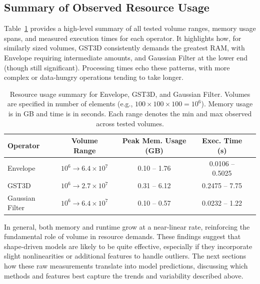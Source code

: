 \subsection{Summary of Observed Resource Usage}
\label{subsec:resource-usage-summary}

Table~\ref{tab:operator_summary_aggregates} provides a high-level summary of all tested volume ranges, memory usage spans, and measured execution times for each operator.
It highlights how, for similarly sized volumes, \ac{GST3D} consistently demands the greatest  \ac{RAM}, with Envelope requiring intermediate amounts, and Gaussian Filter at the lower end (though still significant).
Processing times echo these patterns, with more complex or data-hungry operations tending to take longer.

\begin{table}[htbp]
    \centering
    \begin{tabular}{lcccc}
        \hline
        \textbf{Operator} & \textbf{Volume Range} & \textbf{Peak Mem. Usage (GB)} & \textbf{Exec. Time (s)} \\ \hline
        Envelope &
        $10^6 \!\to\! 6.4\times10^7$ &
        0.10 -- 1.76 &
        0.0106 -- 0.5025 \\
        \ac{GST3D} &
        $10^6 \!\to\! 2.7\times10^7$ &
        0.31 -- 6.12 &
        0.2475 -- 7.75 \\
        Gaussian Filter &
        $10^6 \!\to\! 6.4\times10^7$ &
        0.10 -- 0.57 &
        0.0232 -- 1.22 \\
        \hline
    \end{tabular}
    \caption{Resource usage summary for Envelope, \ac{GST3D}, and Gaussian Filter.
    Volumes are specified in number of elements (e.g., $100 \times 100 \times 100 = 10^6$).
    Memory usage is in GB and time is in seconds.
    Each range denotes the min and max observed across tested volumes.}
    \label{tab:operator_summary_aggregates}
\end{table}

In general, both memory and runtime grow at a near-linear rate, reinforcing the fundamental role of volume in resource demands.
These findings suggest that shape-driven models are likely to be quite effective, especially if they incorporate slight nonlinearities or additional features to handle outliers.
The next sections  how these raw measurements translate into model predictions, discussing which methods and features best capture the trends and variability described above.

